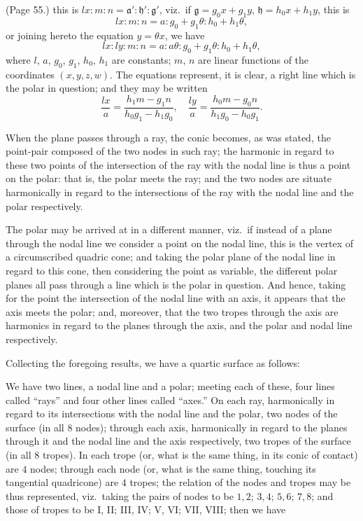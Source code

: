 \documentclass[11pt,a4paper]{article}
\begin{document}
\bigskip

\noindent (Page 55.) this is $lx : m : n = \mathfrak{a}' : \mathfrak{h}' : \mathfrak{g}'$, viz.\ if $\mathfrak{g} = g_0 x + g_1 y$, $\mathfrak{h} = h_0 x + h_1 y$, this is
\[
lx : m : n = a : g_0 + g_1 \theta : h_0 + h_1 \theta,
\]
or joining hereto the equation $y = \theta x$, we have
\[
lx : ly : m : n = a : a\theta : g_0 + g_1 \theta : h_0 + h_1 \theta,
\]
where $l$, $a$, $g_0$, $g_1$, $h_0$, $h_1$ are constants; $m$, $n$ are linear functions of the coordinates $(x, y, z, w)$. The equations represent, it is clear, a right line which is the polar in question; and they may be written
\[
\frac{lx}{a} = \frac{h_1 m - g_1 n}{h_0 g_1 - h_1 g_0}, \quad \frac{ly}{a} = \frac{h_0 m - g_0 n}{h_1 g_0 - h_0 g_1}.
\]

When the plane passes through a ray, the conic becomes, as was stated, the point-pair composed of the two nodes in such ray; the harmonic in regard to these two points of the intersection of the ray with the nodal line is thus a point on the polar: that is, the polar meets the ray; and the two nodes are situate harmonically in regard to the intersections of the ray with the nodal line and the polar respectively.

The polar may be arrived at in a different manner, viz.\ if instead of a plane through the nodal line we consider a point on the nodal line, this is the vertex of a circumscribed quadric cone; and taking the polar plane of the nodal line in regard to this cone, then considering the point as variable, the different polar planes all pass through a line which is the polar in question. And hence, taking for the point the intersection of the nodal line with an axis, it appears that the axis meets the polar; and, moreover, that the two tropes through the axis are harmonics in regard to the planes through the axis, and the polar and nodal line respectively.

Collecting the foregoing results, we have a quartic surface as follows:

We have two lines, a nodal line and a polar; meeting each of these, four lines called ``rays'' and four other lines called ``axes.'' On each ray, harmonically in regard to its intersections with the nodal line and the polar, two nodes of the surface (in all $8$ nodes); through each axis, harmonically in regard to the planes through it and the nodal line and the axis respectively, two tropes of the surface (in all $8$ tropes). In each trope (or, what is the same thing, in its conic of contact) are $4$ nodes; through each node (or, what is the same thing, touching its tangential quadricone) are $4$ tropes; the relation of the nodes and tropes may be thus represented, viz.\ taking the pairs of nodes to be $1, 2$; $3, 4$; $5, 6$; $7, 8$; and those of tropes to be I, II; III, IV; V, VI; VII, VIII; then we have
\end{document}
